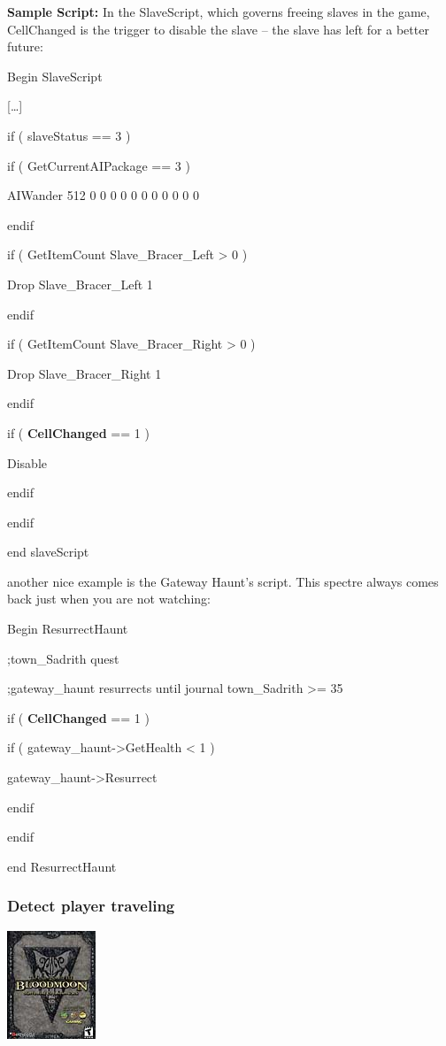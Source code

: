 \documentclass[
]{article}
\begin{document}
\textbf{Sample Script:} In the SlaveScript, which governs freeing slaves
in the game, CellChanged is the trigger to disable the slave -- the
slave has left for a better future:

Begin SlaveScript

{[}\ldots{]}

if ( slaveStatus == 3 )

if ( GetCurrentAIPackage == 3 )

AIWander 512 0 0 0 0 0 0 0 0 0 0 0

endif

if ( GetItemCount Slave\_Bracer\_Left \textgreater{} 0 )

Drop Slave\_Bracer\_Left 1

endif

if ( GetItemCount Slave\_Bracer\_Right \textgreater{} 0 )

Drop Slave\_Bracer\_Right 1

endif

if ( \textbf{CellChanged} == 1 )

Disable

endif

endif

end slaveScript

another nice example is the Gateway Haunt's script. This spectre always
comes back just when you are not watching:

Begin ResurrectHaunt

;town\_Sadrith quest

;gateway\_haunt resurrects until journal town\_Sadrith \textgreater= 35

if ( \textbf{CellChanged} == 1 )

if ( gateway\_haunt-\textgreater GetHealth \textless{} 1 )

gateway\_haunt-\textgreater Resurrect

endif

endif

end ResurrectHaunt

\hypertarget{detect-player-traveling}{%
\subsubsection{Detect player traveling}\label{detect-player-traveling}}

\includegraphics{media/image7.png}
\end{document}
